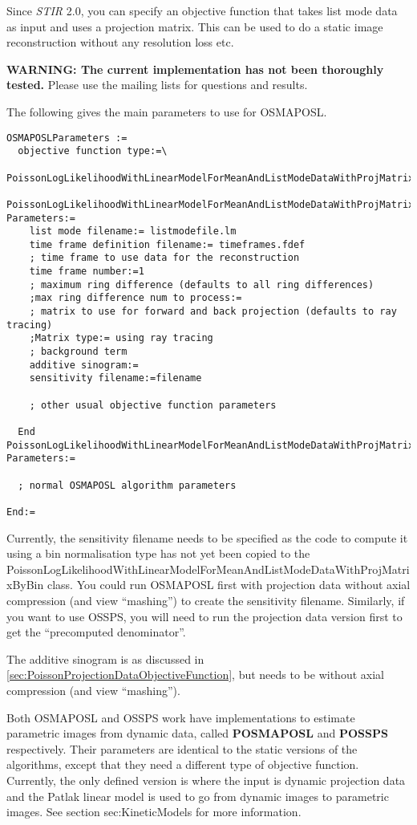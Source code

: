\documentclass{article}
\begin{document}
{ 
}
\label{sec:ListmodeIterativeAlgorithms}
Since \textit{STIR} 2.0, you can specify an objective function that takes list mode data as input
and uses a projection matrix. This can be used to do a static image reconstruction
without any resolution loss etc. 

\textbf{WARNING: The current implementation has not been thoroughly tested.} Please use
the mailing lists for questions and results.

The following gives the main parameters to use for OSMAPOSL.
{ \small
\begin{verbatim}
OSMAPOSLParameters :=
  objective function type:=\
     PoissonLogLikelihoodWithLinearModelForMeanAndListModeDataWithProjMatrixByBin
  PoissonLogLikelihoodWithLinearModelForMeanAndListModeDataWithProjMatrixByBin Parameters:=
    list mode filename:= listmodefile.lm
    time frame definition filename:= timeframes.fdef
    ; time frame to use data for the reconstruction
    time frame number:=1
    ; maximum ring difference (defaults to all ring differences)
    ;max ring difference num to process:=
    ; matrix to use for forward and back projection (defaults to ray tracing)
    ;Matrix type:= using ray tracing
    ; background term
    additive sinogram:=
    sensitivity filename:=filename

    ; other usual objective function parameters 

  End PoissonLogLikelihoodWithLinearModelForMeanAndListModeDataWithProjMatrixByBin Parameters:=

  ; normal OSMAPOSL algorithm parameters 

End:=
\end{verbatim}
}

Currently, the sensitivity filename needs to be specified as the code to compute it using
a bin normalisation type has not yet been copied to the 
PoissonLogLikelihoodWithLinearModelForMeanAndListModeDataWithProjMatrixByBin
class. You could run OSMAPOSL first with projection data without axial compression (and view
``mashing'') to create the sensitivity filename. Similarly, if you want to use OSSPS,
you will need to run the projection data version first to get the ``precomputed denominator''.

The additive sinogram is as discussed in \ref{sec:PoissonProjectionDataObjectiveFunction}, 
but needs to be without axial compression (and view ``mashing'').

{ 
}
\label{sec:ParametricImageIterativeAlgorithms}
Both OSMAPOSL and OSSPS work have implementations to estimate parametric images from
dynamic data, called \textbf{POSMAPOSL} and \textbf{POSSPS} respectively. 
Their parameters are identical to the static versions of the algorithms, except that
they need a different type of objective function. Currently, the only defined version is
where the input is dynamic projection data and the Patlak linear model is used to go from
dynamic images to parametric images. See section {sec:KineticModels} for more information.
\end{document}
